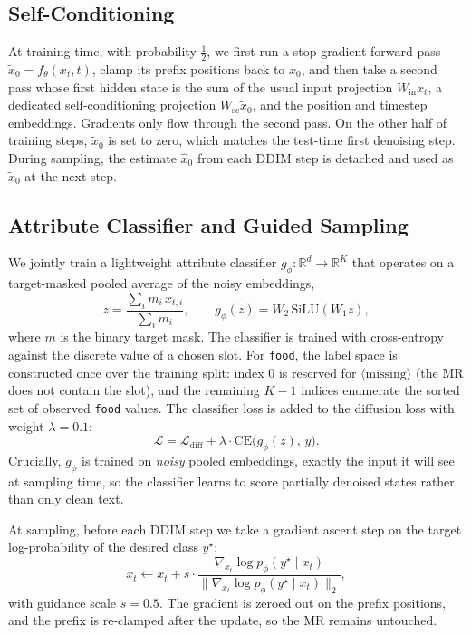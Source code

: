 \documentclass{llncs}
\begin{document}
\subsection{Self-Conditioning}
At training time, with probability $\tfrac12$, we first run a stop-gradient
forward pass $\tilde x_0 = f_\theta(x_t, t)$, clamp its prefix positions back
to $x_0$, and then take a second pass whose first hidden state is the sum of
the usual input projection $W_{\text{in}} x_t$, a dedicated self-conditioning
projection $W_{\text{sc}} \tilde x_0$, and the position and timestep
embeddings. Gradients only flow through the second pass. On the other half of training
steps, $\tilde x_0$ is set to zero, which matches the test-time first
denoising step. During sampling, the estimate $\hat x_0$ from each DDIM
step is detached and used as $\tilde x_0$ at the next step.

\subsection{Attribute Classifier and Guided Sampling}
We jointly train a lightweight attribute classifier
$g_\phi: \mathbb{R}^d \!\to\! \mathbb{R}^K$ that operates on a target-masked
pooled average of the noisy embeddings,
\begin{equation}
  z = \frac{\sum_i m_i\, x_{t,i}}{\sum_i m_i},
  \qquad g_\phi(z) = W_2\,\mathrm{SiLU}(W_1 z),
\end{equation}
where $m$ is the binary target mask. The classifier is trained with cross-entropy
against the discrete value of a chosen slot. For \texttt{food}, the label
space is constructed once over the training split: index $0$ is reserved
for $\langle\text{missing}\rangle$ (the MR does not contain the slot), and
the remaining $K-1$ indices enumerate the sorted set of observed
\texttt{food} values. The classifier loss is added to the diffusion loss
with weight $\lambda\!=\!0.1$:
\begin{equation}
  \mathcal{L} = \mathcal{L}_{\text{diff}}
              + \lambda \cdot \mathrm{CE}\!\big(g_\phi(z),\, y\big).
\end{equation}
Crucially, $g_\phi$ is trained on \emph{noisy} pooled embeddings, exactly the
input it will see at sampling time, so the classifier learns to score
partially denoised states rather than only clean text.

At sampling, before each DDIM step we take a gradient ascent step on the
target log-probability of the desired class $y^\star$:
\begin{equation}
  x_t \leftarrow x_t + s \cdot \frac{\nabla_{x_t} \log p_\phi(y^\star \mid x_t)}
                                     {\|\nabla_{x_t} \log p_\phi(y^\star \mid x_t)\|_2},
\end{equation}
with guidance scale $s\!=\!0.5$. The gradient is zeroed out on the prefix
positions, and the prefix is re-clamped after the update, so the MR remains
untouched.
\end{document}
